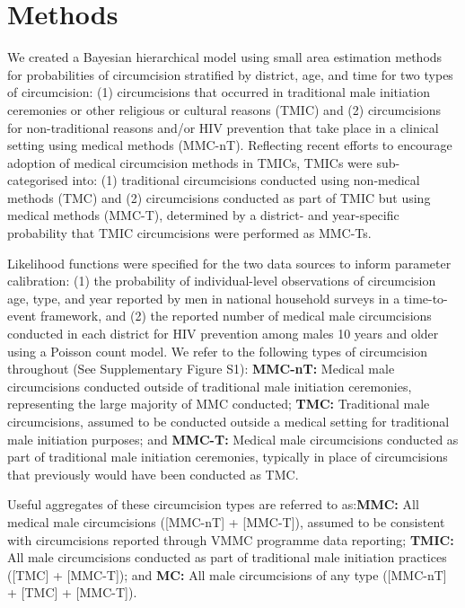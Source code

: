 \documentclass{article}
\begin{document}
\section*{Methods}
\label{sec::methods}


We created a Bayesian hierarchical model using small area estimation methods for probabilities of circumcision stratified by district, age, and time for two types of circumcision: (1) circumcisions that occurred in traditional male initiation ceremonies or other religious or cultural reasons (TMIC) and (2) circumcisions for non-traditional reasons and/or HIV prevention that take place in a clinical setting using medical methods (MMC-nT). Reflecting recent efforts to encourage adoption of medical circumcision methods in TMICs, TMICs were sub-categorised into: (1) traditional circumcisions conducted using non-medical methods (TMC) and (2) circumcisions conducted as part of TMIC but using medical methods (MMC-T), determined by a district- and year-specific probability that TMIC circumcisions were performed as MMC-Ts.

Likelihood functions were specified for the two data sources to inform parameter calibration: (1) the probability of individual-level observations of circumcision age, type, and year reported by men in national household surveys in a time-to-event framework, and (2) the reported number of medical male circumcisions conducted in each district for HIV prevention among males 10 years and older using a Poisson count model. We refer to the following types of circumcision throughout (See Supplementary Figure S1): {\bf MMC-nT:} Medical male circumcisions conducted outside of traditional male initiation ceremonies, representing the large majority of MMC conducted; {\bf TMC:} Traditional male circumcisions, assumed to be conducted outside a medical setting for traditional male initiation purposes; and {\bf MMC-T:} Medical male circumcisions conducted as part of traditional male initiation ceremonies, typically in place of circumcisions that previously would have been conducted as TMC.

Useful aggregates of these circumcision types are referred to as:{\bf MMC:} All medical male circumcisions ([MMC-nT] + [MMC-T]), assumed to be consistent with circumcisions reported through VMMC programme data reporting; {\bf TMIC:} All male circumcisions conducted as part of traditional male initiation practices ([TMC] + [MMC-T]); and {\bf MC:} All male circumcisions of any type ([MMC-nT] + [TMC] + [MMC-T]).
\end{document}
